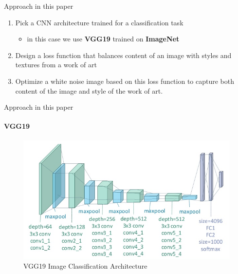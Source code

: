 \documentclass{beamer}
\begin{document}
\begin{frame}{Approach in this paper}
    \begin{enumerate}
        \item Pick a CNN architecture trained for a classification task
        \begin{itemize}
            \item in this case we use \textbf{VGG19} trained on
                \textbf{ImageNet}
        \end{itemize}
        \item Design a loss function that balances content of an image with
            styles and textures from a work of art
        \item Optimize a white noise image based on this loss function to
            capture both content of the image and style of the work of art.
    \end{enumerate}
\end{frame}



\begin{frame}{Approach in this paper}
\framesubtitle{VGG19}
\begin{figure}[H]
\centering
\includegraphics[width=\textwidth]{img/vgg19/classification}
\caption*{VGG19 Image Classification Architecture}
\end{figure}
\end{frame}
\end{document}
